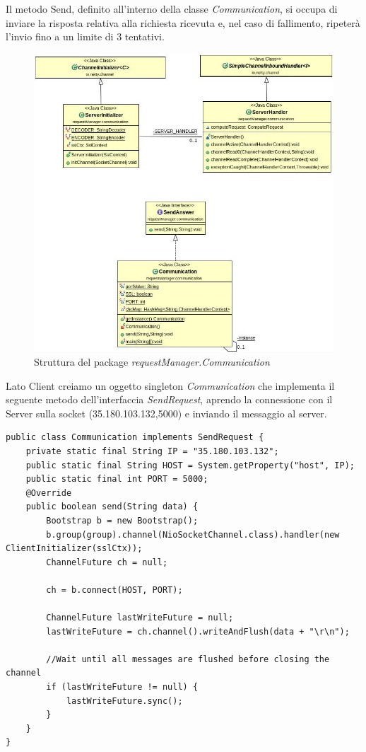 Il metodo Send, definito all'interno della classe \textit{Communication}, si occupa di inviare la risposta relativa alla richiesta ricevuta e, nel caso di fallimento, ripeterà l'invio fino a un limite di 3 tentativi.
\begin{figure}[h]
	\includegraphics[width=\textwidth]{Immagini/CommunicationPackageServer}
	\caption{Struttura del package \textit{requestManager.Communication}}
	\label{fig:requestManager}
\end{figure}
\newpage
Lato Client creiamo un oggetto singleton \textit{Communication} che implementa il seguente metodo dell'interfaccia \textit{SendRequest}, aprendo la connessione con il Server sulla socket (35.180.103.132,5000) e inviando il messaggio al server.

\begin{lstlisting}[caption={My Caption},captionpos=b]
public class Communication implements SendRequest {
	private static final String IP = "35.180.103.132";
	public static final String HOST = System.getProperty("host", IP);
	public static final int PORT = 5000;
	@Override
	public boolean send(String data) {
		Bootstrap b = new Bootstrap();
		b.group(group).channel(NioSocketChannel.class).handler(new ClientInitializer(sslCtx));
		ChannelFuture ch = null;
		
		ch = b.connect(HOST, PORT);
		
		ChannelFuture lastWriteFuture = null;
		lastWriteFuture = ch.channel().writeAndFlush(data + "\r\n");
		
		//Wait until all messages are flushed before closing the channel
		if (lastWriteFuture != null) {
			lastWriteFuture.sync();
		}		
	}
}
\end{lstlisting}

